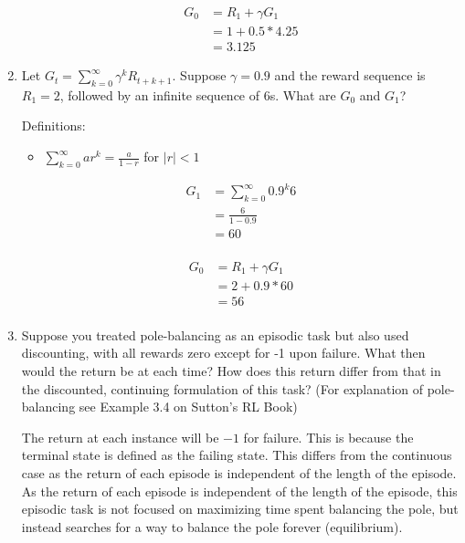 \documentclass[11pt,onecolumn]{article}
\begin{document}
\begin{enumerate}
    \begin{equation}
        \begin{aligned}
            G_0 & = R_{1} + \gamma G_{1} \\ 
            & = 1 + 0.5 * 4.25 \\
            & = 3.125
        \end{aligned}
    \end{equation}
    \item Let $G_t = \sum_{k=0}^\infty \gamma^k R_{t+k+1}$. Suppose $\gamma = 0.9$ and the reward sequence is $R_1 =2$, followed by an infinite sequence of 6s. What are $G_0$ and $G_1$?
    \setlength{\parskip}{6pt}
    
    Definitions:
    \begin{itemize}
        \item $\sum_{k=0}^{\infty} ar^k = \frac{a}{1-r}$ for $\vert r \vert < 1$
    \end{itemize}
    \begin{equation}
        \begin{aligned}
        G_1 & = \sum_{k=0}^\infty 0.9^k6\\
        & = \frac{6}{1-0.9}\\
        & = 60\\ 
        \end{aligned}
    \end{equation}

    \begin{equation}
        \begin{aligned}
        G_0 & = R_{1} + \gamma G_{1} \\ 
        & = 2 + 0.9*60\\
        & = 56\\ 
        \end{aligned}
    \end{equation}
    \item Suppose you treated pole-balancing as an episodic task but also used discounting, with all rewards zero except for -1 upon failure. What then would the return be at each time? How does this return differ from that in the discounted, continuing formulation of this task? (For explanation of pole-balancing see Example 3.4 on Sutton's RL Book)
    \setlength{\parskip}{6pt}

    The return at each instance will be $-1$ for failure. This is because the terminal state is defined as the failing state. This differs from the continuous case as the return of each episode is independent of the length of the episode. As the return of each episode is independent of the length of the episode, this episodic task is not focused on maximizing time spent balancing the pole, but instead searches for a way to balance the pole forever (equilibrium).
    

\end{enumerate}
\end{document}
